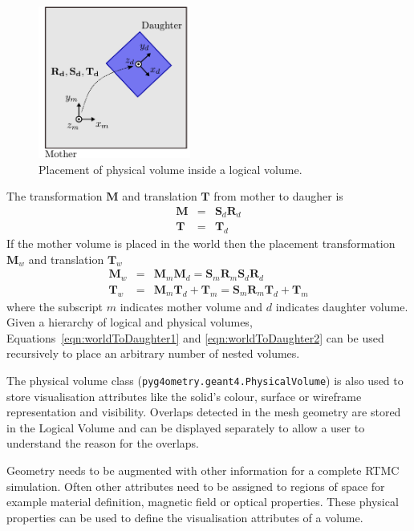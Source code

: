\documentclass[final,5p,times,twocolumn]{elsarticle}
\newcommand{\pyinline}[1]{\lstinline[postbreak={}]{#1}}
\begin{document}
\begin{figure}[htb!]
\begin{center}
\includegraphics[width=5cm]{./diagrams/lvToPv.pdf}
\caption{Placement of physical volume inside a logical volume.}
\label{fig:lvToPv}
\end{center}
\end{figure} 

The transformation  $\mathbf{M}$  and translation $\mathbf{T}$ from mother to daugher is 
\begin{eqnarray}
\mathbf{M} 	& = &  \mathbf{S}_d  \mathbf{R}_d \\
\mathbf{T} 	& = &  \mathbf{T}_d
\end{eqnarray}
%
If the mother volume is placed in the world then the placement transformation $\mathbf{M}_w$ and translation $\mathbf{T}_w$ 
\begin{eqnarray}
\mathbf{M}_w	  	& = & \mathbf{M}_m \mathbf{M}_d  = \mathbf{S}_m \mathbf{R}_m  \mathbf{S}_d \mathbf{R}_d				\label{eqn:worldToDaughter1}\\
\mathbf{T}	_w 		& = & \mathbf{M}_m \mathbf{T}_d + \mathbf{T}_m= \mathbf{S}_m \mathbf{R}_m \mathbf{T}_d + \mathbf{T}_m  \label{eqn:worldToDaughter2}
\end{eqnarray}
where the subscript $m$ indicates mother volume and $d$ indicates daughter volume. Given a hierarchy of logical and physical volumes, 
Equations~\ref{eqn:worldToDaughter1} and \ref{eqn:worldToDaughter2} can be used recursively to place an arbitrary number of nested volumes.

The physical volume class (\pyinline{pyg4ometry.geant4.PhysicalVolume}) is also used to store visualisation attributes like the solid's 
colour, surface or wireframe representation and visibility. Overlaps detected in the mesh geometry are
stored in the Logical Volume and can be  displayed separately to allow a user to understand the reason for 
the overlaps.   

Geometry needs to be augmented with other information for a complete RTMC simulation. Often other attributes need to be 
assigned to regions of space for example material definition, magnetic field or optical properties. These physical properties 
can be used to define the visualisation attributes of a volume. 
\end{document}
